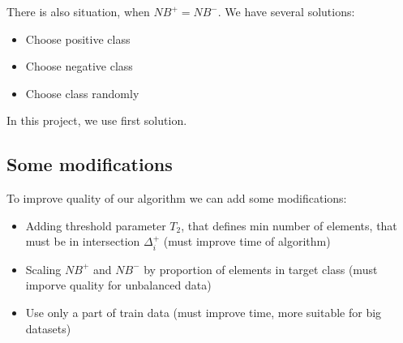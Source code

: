 \documentclass[12t]{article}
\begin{document}
There is also situation, when $NB^{+} = NB^{-}$. We have several solutions:
\begin{itemize}
	\item Choose positive class
	\item Choose negative class
	\item Choose class randomly
\end{itemize}
In this project, we use first solution.

\subsection{Some modifications}
To improve quality of our algorithm we can add some modifications:
\begin{itemize}
\item Adding threshold parameter $T_{2}$, that defines min number of elements, that must be in intersection $\Delta_{i}^{+}$ (must improve time of algorithm)
\item Scaling $NB^{+}$ and $NB^{-}$ by proportion of elements in target class (must imporve quality for unbalanced data)
\item Use only a part of train data (must improve time, more suitable for big datasets)
\end{itemize}
\end{document}
